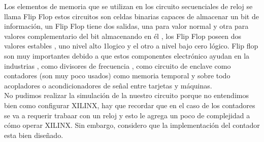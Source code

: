 \documentclass{mylib/reporteConCalif}
\begin{document}
 Los elementos de memoria que se utilizan en los circuito secuenciales de reloj se llama Flip Flop estos circuitos son celdas binarias capaces de almacenar un bit de información, un Flip Flop tiene dos salidas, una para valor normal y otra para valores complementario del bit almacenando en él , los Flip Flop poseen dos valores estables , uno nivel alto 1logico y el otro a nivel bajo cero lógico. Flip flop son muy importantes debido a que estos componentes electrónico ayudan en la industrias , como divisores de frecuencia , como circuito de enclave como contadores (son muy poco usados) como memoria temporal y sobre todo acopladores o acondicionadores de señal entre tarjetas y máquinas.\\

No pudimos realizar la simulación de la nuestro circuito porque no entendimos bien como configurar XILINX, hay que recordar que en el caso de los contadores se va a requerir trabaar con un reloj y esto le agrega un poco de complejidad a cómo operar XILINX. Sin embargo, considero que la implementación del contador esta bien diseñado.
\end{document}
